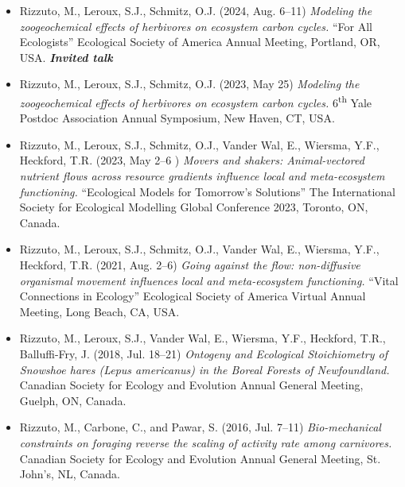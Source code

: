 


\begin{itemize}
  \setlength\itemsep{.25em}
  \item \textcolor{awesome}{Rizzuto, M.}, Leroux, S.J., Schmitz, O.J. (2024, Aug. 6--11) \emph{Modeling the zoogeochemical effects of herbivores on ecosystem carbon cycles.} ``For All Ecologists'' Ecological Society of America Annual Meeting, Portland, OR, USA. \textbf{\emph{Invited talk}}  
  \item \textcolor{awesome}{Rizzuto, M.}, Leroux, S.J., Schmitz, O.J. (2023, May 25) \emph{Modeling the zoogeochemical effects of herbivores on ecosystem carbon cycles.} 6\textsuperscript{th} Yale Postdoc Association Annual Symposium, New Haven, CT, USA.
  \item \textcolor{awesome}{Rizzuto, M.}, Leroux, S.J., Schmitz, O.J., Vander Wal, E., Wiersma, Y.F., Heckford, T.R. (2023, May 2--6 ) \emph{Movers and shakers: Animal-vectored nutrient flows across resource gradients influence local and meta-ecosystem functioning.} ``Ecological Models for Tomorrow's Solutions'' The International Society for Ecological Modelling Global Conference 2023, Toronto, ON, Canada.
  \item \textcolor{awesome}{Rizzuto, M.}, Leroux, S.J., Schmitz, O.J., Vander Wal, E., Wiersma, Y.F., Heckford, T.R. (2021, Aug. 2--6) \emph{Going against the flow: non-diffusive organismal movement influences local and meta-ecosystem functioning.} ``Vital Connections in Ecology'' Ecological Society of America Virtual Annual Meeting, Long Beach, CA, USA.
  \item \textcolor{awesome}{Rizzuto, M.}, Leroux, S.J., Vander Wal, E., Wiersma, Y.F., Heckford, T.R., Balluffi-Fry, J. (2018, Jul. 18--21) \emph{Ontogeny and Ecological Stoichiometry of Snowshoe hares (Lepus americanus) in the Boreal Forests of Newfoundland.} Canadian Society for Ecology and Evolution Annual General Meeting, Guelph, ON, Canada.
  \item \textcolor{awesome}{Rizzuto, M.}, Carbone, C., and Pawar, S. (2016, Jul. 7--11) \emph{Bio-mechanical constraints on foraging reverse the scaling of activity rate among carnivores.} Canadian Society for Ecology and Evolution Annual General Meeting, St. John's, NL, Canada.
\end{itemize}

